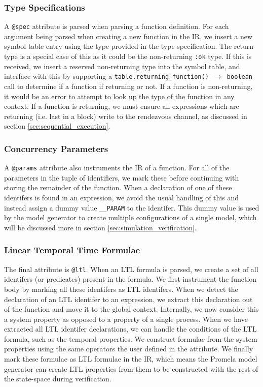 \subsubsection{Type Specifications}
A \texttt{@spec} attribute is parsed when parsing a function definition. For each argument being parsed when creating a new function in the IR, we insert a new symbol table entry using the type provided in the type specification. The return type is a special case of this as it could be the non-returning \texttt{:ok} type. If this is received, we insert a reserved non-returning type into the symbol table, and interface with this by supporting a \texttt{table.returning\_function() $\rightarrow$ boolean} call to determine if a function if returning or not. If a function is non-returning, it would be an error to attempt to look up the type of the function in any context. If a function is returning, we must ensure all expressions which are returning (i.e. last in a block) write to the rendezvous channel, as discussed in section \ref{sec:sequential_execution}.
\par
\subsubsection{Concurrency Parameters}
A \texttt{@params} attribute also instruments the IR of a function. For all of the parameters in the tuple of identifiers, we mark these before continuing with storing the remainder of the function. When a declaration of one of these identifers is found in an expression, we avoid the usual handling of this and instead assign a dummy value \texttt{\_\_PARAM} to the identifer. This dummy value is used by the model generator to create multiple configurations of a single model, which will be discussed more in section \ref{sec:simulation_verification}.
\par
\subsubsection{Linear Temporal Time Formulae}
The final attribute is \texttt{@ltl}. When an LTL formula is parsed, we create a set of all identifers (or predicates) present in the formula. We first instrument the function body by marking all these identifers as LTL identifers. When we detect the declaration of an LTL identifer to an expression, we extract this declaration out of the function and move it to the global context. Internally, we now consider this a system property as opposed to a property of a single process. When we have extracted all LTL identifer declarations, we can handle the conditions of the LTL formula, such as the temporal properties. We construct formulae from the system properties using the same operators the user defined in the attribute. We finally mark these formulae as LTL formulae in the IR, which means the Promela model generator can create LTL properties from them to be constructed with the rest of the state-space during verification.
\par
